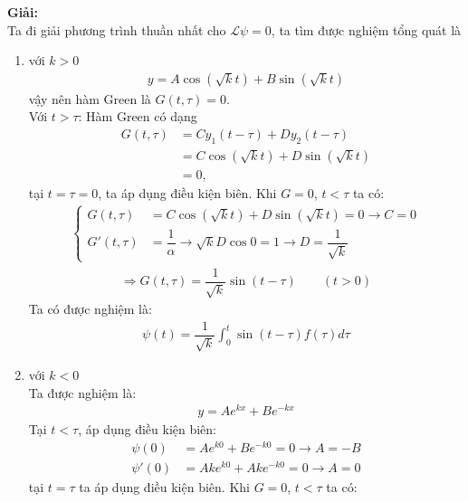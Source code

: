 \documentclass{report}
\newcommand{\f}[2]{\dfrac{#1}{#2}}
\begin{document}
\textbf{Giải:}\\
Ta đi giải phương trình thuần nhất cho $\mathcal{L} \psi = 0$, ta tìm được nghiệm tổng quát là
\begin{enumerate}[label=(\alph*)]
	\item với $k > 0$
	      \begin{align*}
		      y = A \cos(\sqrt{k} t) + B \sin(\sqrt{k} t)
	      \end{align*}
	      vậy nên hàm Green là $G(t,\tau) = 0$.\\
	      Với $t > \tau$: Hàm Green có dạng
	      \begin{align*}
		      G(t,\tau)
		       & = C y_1(t - \tau) + Dy_2(t - \tau)        \\
		       & = C \cos(\sqrt{k} t) + D \sin(\sqrt{k} t) \\
		       & = 0,
	      \end{align*}
	      tại $t = \tau = 0$, ta áp dụng điều kiện biên. Khi $G =0$, $t<\tau$ ta có:
	      \begin{align*}
		      \begin{cases}
			      G(t,\tau)  & = C \cos(\sqrt{k} t) + D \sin(\sqrt{k} t) = 0 \rightarrow C = 0                   \\
			      G'(t,\tau) & = \f{1}{\alpha} \rightarrow \sqrt{k} D \cos 0 = 1 \rightarrow D = \f{1}{\sqrt{k}}
		      \end{cases}
	      \end{align*}
	      \begin{align*}
		      \Rightarrow G(t,\tau) = \f{1}{\sqrt{k}} \sin (t - \tau)  \quad \quad (t > 0)
	      \end{align*}
	      Ta có được nghiệm là:
	      \begin{align*}
		      \psi(t) = \f{1}{\sqrt{k}} \int_{0}^{t} \sin(t-\tau) f(\tau) d\tau
	      \end{align*}
	\item  với $k < 0$\\
	      Ta được nghiệm là:
	      \begin{align*}
		      y = A e^{kx} + B e^{-kx}
	      \end{align*}
	      Tại $t<\tau$,
	      áp dụng điều kiện biên:
	      \begin{align*}
		      \psi(0)  & = A e^{k0} + B e^{-k0} = 0  \rightarrow A = - B \\
		      \psi'(0) & = Ak e^{k0} + Ak e^{-k0} = 0  \rightarrow A = 0
	      \end{align*}
	      tại $t = \tau$ ta áp dụng điều kiện biên. Khi $G =0$, $t<\tau$ ta có:

\end{enumerate}
\end{document}
